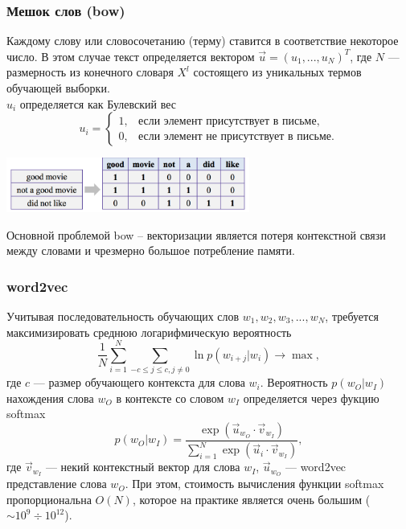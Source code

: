 \documentclass[compress,professionalfont]{beamer}
\begin{document}
\begin{frame}
\frametitle{Мешок слов (bow)}

Каждому слову или словосочетанию (терму) ставится в соответствие некоторое число. В этом случае текст определяется вектором $\vec{u} = (u_1, ..., u_N)^T$,
где $N$ --- размерность из конечного словаря $X^l$ состоящего из уникальных термов обучающей выборки. \\
$u_i$ определяется как Булевский вес
$$
u_i = \begin{cases}
1, & \mbox{если элемент присутствует в письме}, \\
0, & \mbox{если элемент не присутствует в письме}.
\end{cases}
$$

\begin{center}
\includegraphics[width=0.6\textwidth]{bow.png}
\end{center}

Основной проблемой bow -- векторизации является потеря контекстной связи между словами и чрезмерно большое потребление памяти.

\end{frame}

\begin{frame}
\frametitle{word2vec}

Учитывая последовательность обучающих слов $w_1, w_2, w_3, ..., w_N$, требуется максимизировать среднюю логарифмическую вероятность
$$
\dfrac{1}{N}\sum_{i=1}^{N}\sum_{-c \leqslant j \leqslant c, j \neq 0} \ln p(w_{i+j}|w_i) \rightarrow \max,
$$
где $c$ --- размер обучающего контекста для слова $w_i$. Вероятность $p(w_O|w_I)$ нахождения слова $w_O$ в контексте со словом $w_I$ определяется через фукцию softmax
$$
p(w_O|w_I) = \dfrac{\exp({\vec{u}_{w_O}\cdot\vec{v}_{w_I}})}{\sum_{i=1}^{N} \exp({\vec{u}_{i} \cdot \vec{v}_{w_I}})},
$$
где $\vec{v}_{w_I}$ --- некий контекстный вектор для слова $w_I$, $\vec{u}_{w_O}$ --- word2vec представление слова $w_O$.
При этом, стоимость вычисления функции softmax пропорциональна $O(N)$, которое на практике является очень большим ($\sim10^9\div10^{12}$).


\end{frame}
\end{document}

